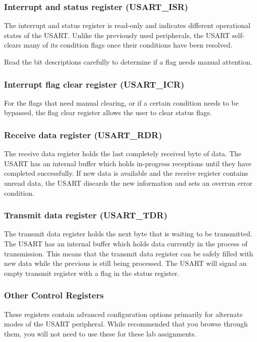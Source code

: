 \documentclass[11pt,fleqn]{book} %
\begin{document}
\subsubsection{Interrupt and status register (USART\_ISR)}
The interrupt and status register is read-only and indicates different operational states of the USART. Unlike the previously used peripherals, the USART self-clears many of its condition flags once their conditions have been resolved. 

Read the bit descriptions carefully to determine if a flag needs manual attention.

\subsubsection{Interrupt flag clear register (USART\_ICR)}
For the flags that need manual clearing, or if a certain condition needs to be bypassed, the flag clear register allows the user to clear status flags. 

\subsubsection{Receive data register (USART\_RDR)}
The receive data register holds the last completely received byte of data. The USART has an internal buffer which holds in-progress receptions until they have completed successfully. If new data is available and the receive register contains unread data, the USART discards the new information and sets an overrun error condition.

\subsubsection{Transmit data register (USART\_TDR)}
The transmit data register holds the next byte that is waiting to be transmitted. The USART has an internal buffer which holds data currently in the process of transmission. This means that the transmit data register can be safely filled with new data while the previous is still being processed. The USART will signal an empty transmit register with a flag in the status register. 

\subsubsection{Other Control Registers}
These registers contain advanced configuration options primarily for alternate modes of the USART peripheral. While recommended that you browse through them, you will not need to use these for these lab assignments.
\end{document}
